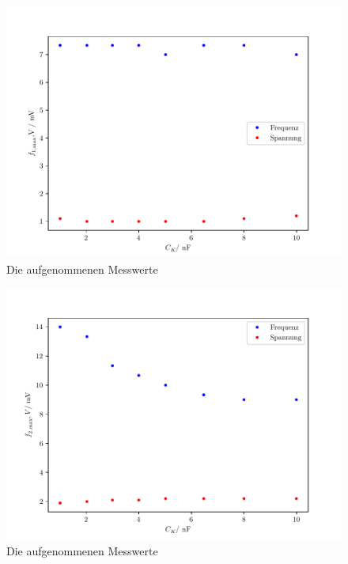 \begin{figure}
  \centering
  \includegraphics{freq1.pdf}
  \caption{Die aufgenommenen Messwerte}
  \label{fig:freq1}
\end{figure}

\begin{figure}
  \centering
  \includegraphics{freq2.pdf}
  \caption{Die aufgenommenen Messwerte}
  \label{fig:freq2}
\end{figure}


